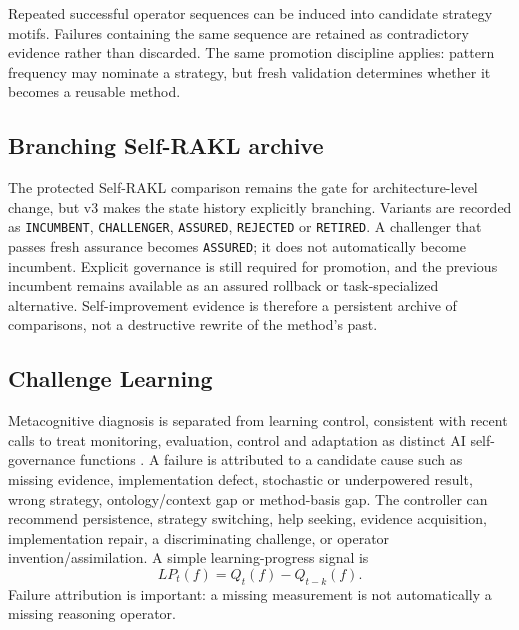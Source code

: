 Repeated successful operator sequences can be induced into candidate strategy motifs. Failures containing the same sequence are retained as contradictory evidence rather than discarded. The same promotion discipline applies: pattern frequency may nominate a strategy, but fresh validation determines whether it becomes a reusable method.

\subsection{Branching Self-RAKL archive}
The protected Self-RAKL comparison remains the gate for architecture-level change, but v3 makes the state history explicitly branching. Variants are recorded as \texttt{INCUMBENT}, \texttt{CHALLENGER}, \texttt{ASSURED}, \texttt{REJECTED} or \texttt{RETIRED}. A challenger that passes fresh assurance becomes \texttt{ASSURED}; it does not automatically become incumbent. Explicit governance is still required for promotion, and the previous incumbent remains available as an assured rollback or task-specialized alternative. Self-improvement evidence is therefore a persistent archive of comparisons, not a destructive rewrite of the method's past.
\subsection{Challenge Learning}
Metacognitive diagnosis is separated from learning control, consistent with recent calls to treat monitoring, evaluation, control and adaptation as distinct AI self-governance functions \cite{ji2026}. A failure is attributed to a candidate cause such as missing evidence, implementation defect, stochastic or underpowered result, wrong strategy, ontology/context gap or method-basis gap. The controller can recommend persistence, strategy switching, help seeking, evidence acquisition, implementation repair, a discriminating challenge, or operator invention/assimilation. A simple learning-progress signal is
\begin{equation}LP_t(f)=Q_t(f)-Q_{t-k}(f).\end{equation}
Failure attribution is important: a missing measurement is not automatically a missing reasoning operator.

